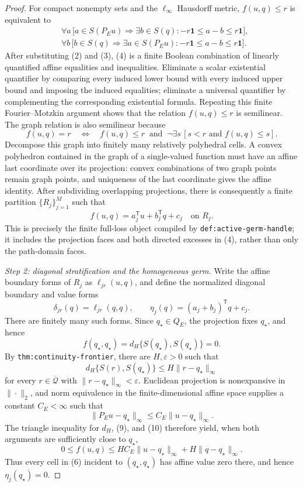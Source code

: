 \documentclass{article}
\begin{document}
\begin{proof}
For compact nonempty sets and the \(\ell_\infty\) Hausdorff metric, \(f(u,q)\leq r\) is equivalent to
\[
\begin{split}
 &\forall a\,\bigl[a\in S(P_Eu)\Longrightarrow
       \exists b\in S(q):-r\mathbf 1\leq a-b\leq r\mathbf 1\bigr],\\
 &\forall b\,\bigl[b\in S(q)\Longrightarrow
       \exists a\in S(P_Eu):-r\mathbf 1\leq a-b\leq r\mathbf 1\bigr].
\end{split}
\tag{4}
\]
After substituting (2) and (3), (4) is a finite Boolean combination of linearly quantified affine equalities and inequalities.  Eliminate a scalar existential quantifier by comparing every induced lower bound with every induced upper bound and imposing the induced equalities; eliminate a universal quantifier by complementing the corresponding existential formula.  Repeating this finite Fourier--Motzkin argument shows that the relation \(f(u,q)\leq r\) is semilinear.  The graph relation is also semilinear because
\[
 f(u,q)=r
 \quad\Longleftrightarrow\quad
 f(u,q)\leq r\ \text{ and }\
 \neg\exists s\,[s<r\text{ and }f(u,q)\leq s].
\tag{5}
\]
Decompose this graph into finitely many relatively polyhedral cells.  A convex polyhedron contained in the graph of a single-valued function must have an affine last coordinate over its projection: convex combinations of two graph points remain graph points, and uniqueness of the last coordinate gives the affine identity.  After subdividing overlapping projections, there is consequently a finite partition \(\{R_j\}_{j=1}^M\) such that
\[
 f(u,q)=a_j^{\mathsf T}u+b_j^{\mathsf T}q+c_j
 \quad\text{on }R_j.
\tag{6}
\]
This is precisely the finite full-loss object compiled by \texttt{def:active-germ-handle}; it includes the projection faces and both directed excesses in (4), rather than only the path-domain faces.

\emph{Step 2: diagonal stratification and the homogeneous germ.}
Write the affine boundary forms of \(R_j\) as \(\ell_{jr}(u,q)\), and define the normalized diagonal boundary and value forms
\[
 \delta_{jr}(q)=\ell_{jr}(q,q),
 \qquad
 \eta_j(q)=(a_j+b_j)^{\mathsf T}q+c_j.
\tag{7}
\]
There are finitely many such forms.  Since \(q_\star\in Q_E\), the projection fixes \(q_\star\), and hence
\[
 f(q_\star,q_\star)=d_H\{S(q_\star),S(q_\star)\}=0.
\tag{8}
\]
By \texttt{thm:continuity-frontier}, there are \(H,\varepsilon>0\) such that
\[
 d_H\{S(r),S(q_\star)\}\leq H\|r-q_\star\|_\infty
\tag{9}
\]
for every \(r\in\overline{\mathcal Q}\) with \(\|r-q_\star\|_\infty<\varepsilon\).  Euclidean projection is nonexpansive in \(\|\cdot\|_2\), and norm equivalence in the finite-dimensional affine space supplies a constant \(C_E<\infty\) such that
\[
 \|P_Eu-q_\star\|_\infty
 \leq C_E\|u-q_\star\|_\infty.
\tag{10}
\]
The triangle inequality for \(d_H\), (9), and (10) therefore yield, when both arguments are sufficiently close to \(q_\star\),
\[
 0\leq f(u,q)
 \leq H C_E\|u-q_\star\|_\infty
      +H\|q-q_\star\|_\infty.
\tag{11}
\]
Thus every cell in (6) incident to \((q_\star,q_\star)\) has affine value zero there, and hence \(\eta_j(q_\star)=0\).


\end{proof}
\end{document}
